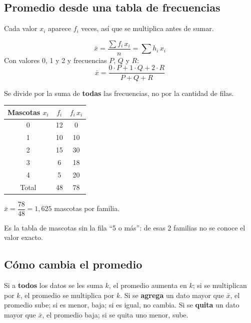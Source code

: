 \subsection{Promedio desde una tabla de frecuencias}
Cada valor $x_i$ aparece $f_i$ veces, así que se multiplica antes de sumar.

\begin{minipage}[t]{0.55\linewidth}\vspace{0pt}
\begin{clave} \[ \bar{x} = \frac{\sum f_i\,x_i}{n} = \sum h_i\,x_i \]
Con valores 0, 1 y 2 y frecuencias $P$, $Q$ y $R$:
\[ \bar{x} = \frac{0\cdot P + 1\cdot Q + 2\cdot R}{P + Q + R} \]\end{clave}
\begin{ojo}[Denominador] Se divide por la suma de \textbf{todas} las frecuencias, no por la cantidad de filas.\end{ojo}
\end{minipage}\hfill
\begin{minipage}[t]{0.4\linewidth}\vspace{0pt}\centering\small
\begin{tabular}{@{}ccc@{}}\toprule
Mascotas $x_i$ & $f_i$ & $f_i\,x_i$\\\midrule
0 & 12 & 0\\ 1 & 10 & 10\\ 2 & 15 & 30\\ 3 & 6 & 18\\ 4 & 5 & 20\\\midrule
Total & 48 & 78\\\bottomrule
\end{tabular}\par\smallskip
$\bar{x} = \dfrac{78}{48} = 1{,}625$ mascotas por familia.\par\smallskip
{\footnotesize\color{gris}Es la tabla de mascotas sin la fila ``5 o más'': de esas 2 familias no se conoce el valor exacto.}
\end{minipage}

\subsection{Cómo cambia el promedio}
Si a \textbf{todos} los datos se les suma $k$, el promedio aumenta en $k$; si se multiplican por $k$, el promedio se multiplica por $k$. Si se \textbf{agrega} un dato mayor que $\bar{x}$, el promedio sube; si es menor, baja; si es igual, no cambia. Si se \textbf{quita} un dato mayor que $\bar{x}$, el promedio baja; si se quita uno menor, sube.


